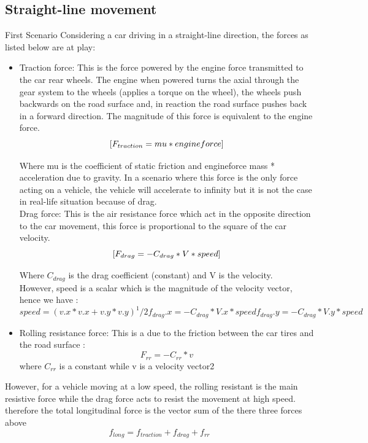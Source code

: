 \documentclass{book}
\begin{document}
\subsection{Straight-line movement} First Scenario
Considering a car driving in a straight-line direction, the forces as listed below are at play:
\begin{itemize}
    \item Traction force: This is the force powered by the engine force transmitted to the car rear wheels. The engine when powered turns the axial through the gear system to the wheels (applies a torque on the wheel), the wheels push backwards on the road surface and, in reaction the road surface pushes back in a forward direction. The magnitude of this force is equivalent to the engine force. \\

    \begin{equation}
     \mbox [{F_{traction}} = { mu * engineforce }]
    \end{equation}

  Where mu is the coefficient of static friction and engineforce mass * acceleration due to gravity. In a scenario where this force is the only force acting on a vehicle, the vehicle will accelerate to infinity  but it is not the case in real-life situation because of drag.\\
  Drag force: This is the air resistance force which act in the opposite direction to the car movement, this force is proportional to the square of the car velocity.\\

     \begin{equation}
     \mbox[{F_{drag}} = { - C_{drag} * V * speed }]
    \end{equation}

  Where $C_{drag}$ is the drag coefficient (constant) and V is the velocity.\\
  However, speed is a scalar which is the magnitude of the velocity vector, hence we have :
     \begin{equation}
     speed = {(v.x * v.x + v.y * v.y)^ 1/2}
     f_{drag}.x  = {- C_{drag} * V.x * speed }
     f_{drag}.y = {- C_{drag} * V.y * speed}
    \end{equation}

  \item Rolling resistance force: This is a due to the friction between the car tires and the road surface :
  \begin{equation}
   F_{rr} = - C_{rr} * v
  \end{equation}
  where $C_{rr}$ is a constant while v is a velocity vector2
   \end{itemize}
    However, for a vehicle moving at a low speed, the rolling resistant is the main resistive force while the drag force acts  to resist the movement at high speed. therefore the total longitudinal force is the vector sum of the there three forces above
    \begin{equation}
   f_{long} = f_{traction} + f_{drag} + f_{rr}
  \end{equation}
\end{document}
